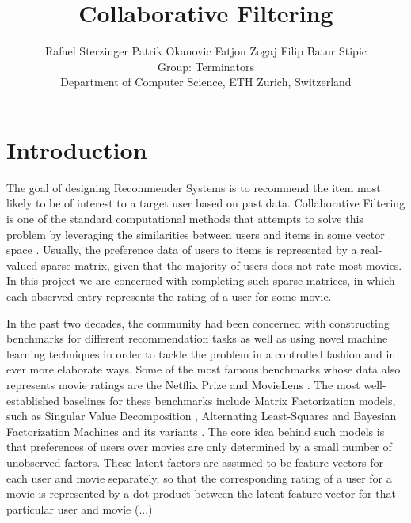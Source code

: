 \documentclass[10pt,conference,compsocconf]{IEEEtran}
\newcommand{\spacing}{\hspace{1cm}}
\begin{document}
    \title{Collaborative Filtering}

    \author{
        Rafael Sterzinger \spacing Patrik Okanovic \spacing Fatjon Zogaj \spacing Filip Batur Stipic\\
        Group: Terminators\\
        Department of Computer Science, ETH Zurich, Switzerland
    }

    \maketitle

    \begin{abstract}

    \end{abstract}


    \section{Introduction}

    The goal of designing Recommender Systems is to recommend the item most likely to be of interest to a target user based on past data.
    Collaborative Filtering is one of the standard computational methods that attempts to solve this problem by leveraging the similarities between users and items in some vector space \cite{CF_survey}.
    Usually, the preference data of users to items is represented by a real-valued sparse matrix, given that the majority of users does not rate most movies.
    In this project we are concerned with completing such sparse matrices, in which each observed entry represents the rating of a user for some movie.


    In the past two decades, the community had been concerned with constructing benchmarks for different recommendation tasks as well as using novel machine learning techniques in order to tackle the problem in a controlled fashion and in ever more elaborate ways.
    Some of the most famous benchmarks whose data also represents movie ratings are the Netflix Prize \cite{Netflix} and MovieLens \cite{Movielens}.
    The most well-established baselines for these benchmarks include Matrix Factorization models, such as Singular Value Decomposition \cite{svd}, Alternating Least-Squares \cite{als} and Bayesian Factorization Machines and its variants \cite{freudenthaler_bayesian_2011, salakhutdinov_bayesian_2008}.
    The core idea behind such models is that preferences of users over movies are only determined by a small number of unobserved factors.
    These latent factors are assumed to be feature vectors for each user and movie separately, so that the corresponding rating of a user for a movie is represented by a dot product between the latent feature vector for that particular user and movie (...)
\end{document}
